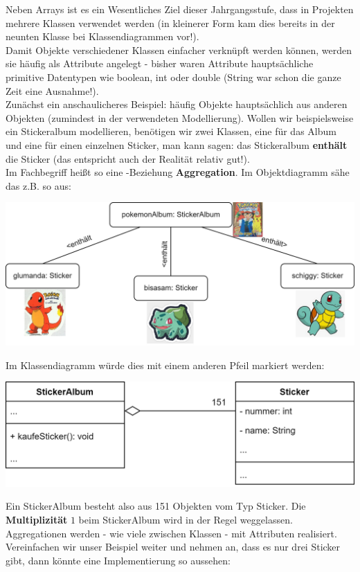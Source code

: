 \documentclass[fontsize=12pt]{article}
\begin{document}
\thispagestyle{firstpage}
\setlength{\headsep}{12pt}
Neben Arrays ist es ein Wesentliches Ziel dieser Jahrgangsstufe, dass in Projekten mehrere Klassen verwendet werden (in kleinerer Form kam dies bereits in der neunten Klasse bei Klassendiagrammen vor!). \\
Damit Objekte verschiedener Klassen einfacher verknüpft werden können, werden sie häufig als Attribute angelegt - bisher waren Attribute hauptsächliche primitive Datentypen wie boolean, int oder double (String war schon die ganze Zeit eine Ausnahme!). \\
Zunächst ein anschaulicheres Beispiel: häufig  Objekte hauptsächlich aus anderen Objekten (zumindest in der verwendeten Modellierung). Wollen wir beispielsweise ein Stickeralbum modellieren, benötigen wir zwei Klassen, eine für das Album und eine für einen einzelnen Sticker, man kann sagen: das Stickeralbum \textbf{enthält} die Sticker (das entspricht auch der Realität relativ gut!). \\
Im Fachbegriff heißt so eine -Beziehung \textbf{Aggregation}. Im Objektdiagramm sähe das z.B. so aus: 
\begin{center}
    \includegraphics[scale=0.35]{media/obj_diagramm_album.png}
\end{center}
Im Klassendiagramm würde dies mit einem anderen Pfeil markiert werden:
\begin{center}
    \includegraphics[scale=0.20]{media/class_diagram_album.png}
\end{center}
Ein StickerAlbum besteht also aus 151 Objekten vom Typ Sticker. Die \textbf{Multiplizität} $1$ beim StickerAlbum wird in der Regel weggelassen. Aggregationen werden - wie viele  zwischen Klassen - mit Attributen realisiert. Vereinfachen wir unser Beispiel weiter und nehmen an, dass es nur drei Sticker gibt, dann könnte eine Implementierung so aussehen: 
\begin{verbatim}
    
\end{verbatim}
\end{document}
